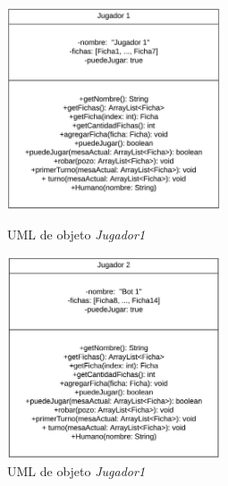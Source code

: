 \documentclass[12pt]{article}
\begin{document}
  \begin{figure}[h!]
    \centering
    \begin{minipage}[l]{0.45\textwidth}
      \centering
      \includegraphics[height=6cm]{umlo3.png}
      \caption{UML de objeto \textit{Jugador1}}
    \end{minipage}
    \begin{minipage}[r]{0.45\textwidth} 
      \centering
      \includegraphics[height=6cm]{umlo4.png}
      \caption{UML de objeto \textit{Jugador1}}
    \end{minipage}
  \end{figure}
\end{document}
